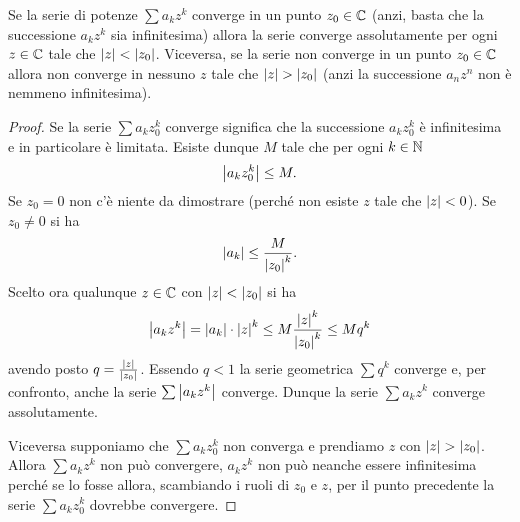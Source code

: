 \begin{theorem}
\mymark{***}
Se la serie di potenze $\sum a_k z^k$ converge in un punto $z_0\in \mathbb C$
(anzi, basta che la successione $a_k z^k$ sia infinitesima)
allora la serie
converge assolutamente per ogni $z\in \mathbb C$ tale che ${\left|z\right|}< {\left|z_0\right|}$.
Viceversa, se la serie non converge in un punto $z_0\in \mathbb C$
allora
non  converge in nessuno $z$ tale che ${\left|z\right|} > {\left|z_0\right|}$ (anzi la successione
$a_n z^n$ non è nemmeno infinitesima).
\end{theorem}
%
\begin{proof}
\mymark{*}
Se la serie $\sum a_k z_0^k$ converge significa che la successione
$a_k z_0^k$ è infinitesima e in particolare è limitata.
Esiste dunque $M$ tale che per ogni $k\in \mathbb N$
\[
 {\left|a_k z_0^k\right|} \le M.
\]
Se $z_0=0$ non c'è niente da dimostrare (perché non esiste $z$ tale che ${\left|z\right|}<0$).
Se $z_0\neq 0$ si ha
\[
 {\left|a_k\right|} \le \frac{M}{{\left|z_0\right|}^k}.
\]
Scelto ora qualunque $z\in \mathbb C$ con ${\left|z\right|} < {\left|z_0\right|}$ si ha
\[
  {\left|a_k z^k\right|} = {\left|a_k\right|}\cdot {\left|z\right|}^k \le M \frac{{\left|z\right|}^k}{{\left|z_0\right|}^k}
  \le M q^k
\]
avendo posto $q = \frac{{\left|z\right|}}{{\left|z_0\right|}}$.
Essendo $q<1$ la serie geometrica $\sum q^k$ converge e, per confronto,
anche la serie $\sum {\left|a_k z^k\right|}$ converge.
Dunque la serie $\sum a_k z^k$ converge assolutamente.

Viceversa supponiamo che $\sum a_k z_0^k$ non converga
e prendiamo $z$ con ${\left|z\right|} > {\left|z_0\right|}$.
Allora $\sum a_k z^k$ non può convergere,
$a_k z^k$ non può neanche essere infinitesima perché
se lo fosse allora, scambiando i ruoli di $z_0$ e $z$,
per il punto precedente la serie $\sum a_k z_0^k$ dovrebbe convergere.
\end{proof}

